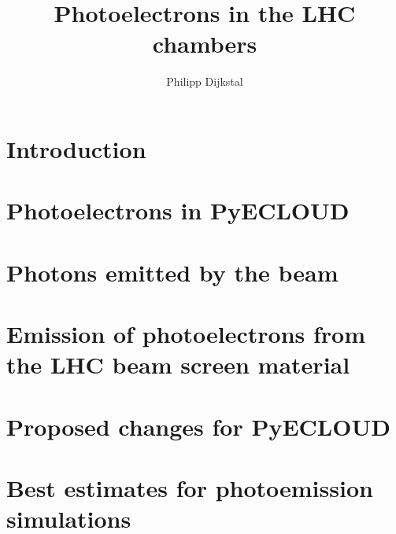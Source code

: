 \documentclass{scrartcl}
\title{Photoelectrons in the LHC chambers}
\author{Philipp Dijkstal}
\begin{document}
\maketitle
\tableofcontents

\section{Introduction}


\section{Photoelectrons in PyECLOUD}
    

\clearpage
\section{Photons emitted by the beam}
    

\clearpage
\section{Emission of photoelectrons from the LHC beam screen material}
	
    
    
    
    

\clearpage
\section{Proposed changes for PyECLOUD}
    

\clearpage
\section{Best estimates for photoemission simulations}
    

\clearpage
{}


\end{document}

